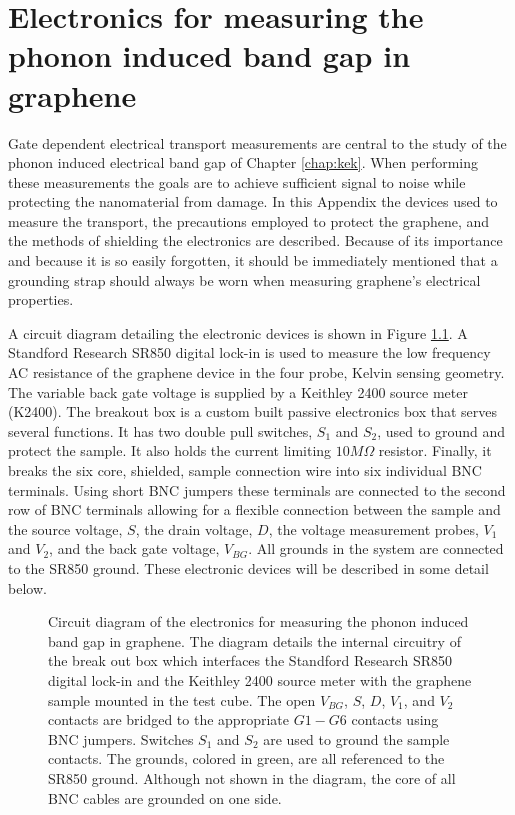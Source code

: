 \chapter{Electronics for measuring the phonon induced band gap in graphene\label{chap:elec}}
Gate dependent electrical transport measurements are central to the study of the phonon induced electrical band gap of Chapter \ref{chap:kek}.
When performing these measurements the goals are to achieve sufficient signal to noise while protecting the nanomaterial from damage.
In this Appendix the devices used to measure the transport, the precautions employed to protect the graphene, and the methods of shielding the electronics are described.
Because of its importance and because it is so easily forgotten, it should be immediately mentioned that a grounding strap should always be worn when measuring graphene's electrical properties.

A circuit diagram detailing the electronic devices is shown in Figure \ref{fig:elec:wires}.
A Standford Research SR850 digital lock-in is used to measure the low frequency AC resistance of the graphene device in the four probe, Kelvin sensing geometry.
The variable back gate voltage is supplied by a Keithley 2400 source meter (K2400).
The breakout box is a custom built passive electronics box that serves several functions.
It has two double pull switches, $S_1$ and $S_2$, used to ground and protect the sample.
It also holds the current limiting $10 M \Omega$ resistor.
Finally, it breaks the six core, shielded, sample connection wire into six individual BNC terminals.
Using short BNC jumpers these terminals are connected to the second row of BNC terminals allowing for a flexible connection between the sample and the source voltage, $S$, the drain voltage, $D$, the voltage measurement probes, $V_1$ and $V_2$, and the back gate voltage, $V_{BG}$.
All grounds in the system are connected to the SR850 ground.
These electronic devices will be described in some detail below.

\begin{figure}
	\begin{center}
	
	\end{center}
	\caption[Circuit diagram of the electronics for measuring the phonon induced band gap in graphene]{\label{fig:elec:wires}
		Circuit diagram of the electronics for measuring the phonon induced band gap in graphene.
		The diagram details the internal circuitry of the break out box which interfaces the Standford Research SR850 digital lock-in and the Keithley 2400 source meter with the graphene sample mounted in the test cube.
		The open $V_{BG}$, $S$, $D$, $V_1$, and $V_2$ contacts are bridged to the appropriate $G1-G6$ contacts using BNC jumpers.
		Switches $S_1$ and $S_2$ are used to ground the sample contacts.
		The grounds, colored in green, are all referenced to the SR850 ground.
		Although not shown in the diagram, the core of all BNC cables are grounded on one side.
	}
\end{figure}

